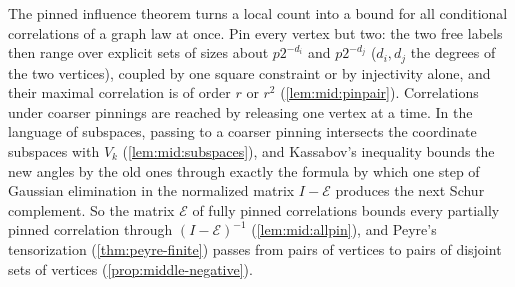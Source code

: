 The pinned influence theorem turns a local count into a bound for all
conditional correlations of a graph law at once. Pin every vertex but two: the
two free labels then range over explicit sets of sizes about $p2^{-d_i}$ and $p2^{-d_j}$ ($d_i,d_j$ the degrees of the two vertices), coupled
by one square constraint or by injectivity alone, and their maximal
correlation is of order $r$ or $r^2$ (\cref{lem:mid:pinpair}). Correlations
under coarser pinnings are reached by releasing one vertex at a time. In the
language of subspaces, passing to a coarser pinning intersects the coordinate subspaces with $V_k$ (\cref{lem:mid:subspaces}), and Kassabov's inequality bounds the new angles by the
old ones through exactly the formula by which one step of Gaussian elimination
in the normalized matrix $I-\mathcal E$ produces the next Schur complement. So
the matrix $\mathcal E$ of fully pinned correlations bounds every partially
pinned correlation through $(I-\mathcal E)^{-1}$
(\cref{lem:mid:allpin}), and Peyre's tensorization
(\cref{thm:peyre-finite}) passes from pairs of vertices to pairs of disjoint
sets of vertices (\cref{prop:middle-negative}).


